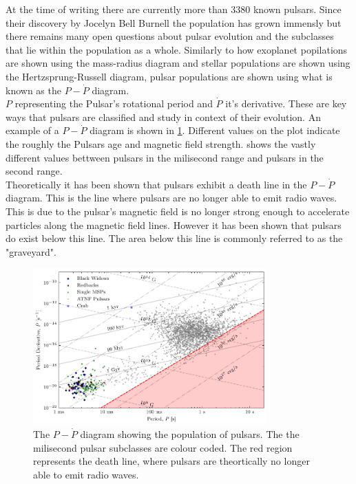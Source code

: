 At the time of writing there are currently more than 3380 known pulsars. Since their discovery by Jocelyn Bell Burnell \citep{hewish_observation_1968} the population has grown immensly but there remains many open questions about pulsar evolution and the subclasses that lie within the population as a whole. Similarly to how exoplanet popilations are shown using the mass-radius diagram and stellar populations are shown using the Hertzsprung-Russell diagram, pulsar populations are shown using what is known as the $P-\dot P$ diagram. \\

$P$ representing the Pulsar's rotational period and $\dot P$ it's derivative. These are key ways that pulsars are classified and study in context of their evolution. An example of a $P-\dot P$ diagram is shown in \cref{fig:p-pdot}. Different values on the plot indicate the roughly the Pulsars age and magnetic field strength.  shows the vastly different values bettween pulsars in the milisecond range and pulsars in the second range. \\ 

Theoretically it has been shown that pulsars exhibit a death line in the $P-\dot P$ diagram. This is the line where pulsars are no longer able to emit radio waves. This is due to the pulsar's magnetic field is no longer strong enough to accelerate particles along the magnetic field lines. However it has been shown that pulsars do exist below this line. The area below this line is commonly referred to as the "graveyard". \\
\begin{figure}
    \centering
    \includegraphics[width=0.8\textwidth]{figs/PPdot-diagram.pdf}
    \caption{The $P-\dot P$ diagram showing the population of pulsars. The the milisecond pulsar subclasses are colour coded. The red region represents the death line, where pulsars are theortically no longer able to emit radio waves.}
    \label{fig:p-pdot}
\end{figure}

